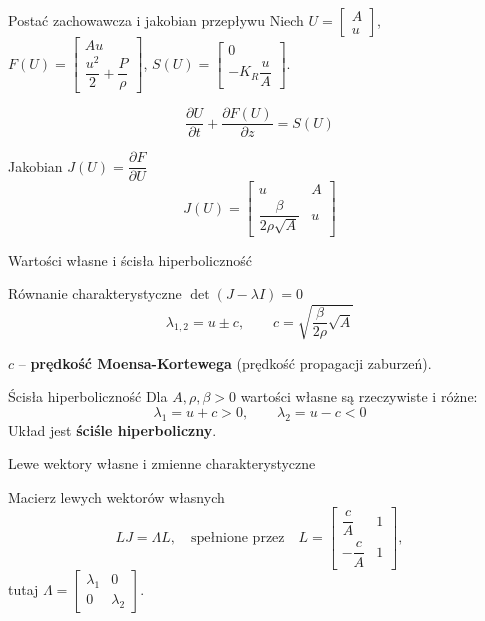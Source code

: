 \documentclass[aspectratio=169]{beamer}
\begin{document}
\begin{frame}{Postać zachowawcza i jakobian przepływu}
  Niech $U = \begin{bmatrix}A\\u\end{bmatrix}$, $F(U) = \begin{bmatrix}Au\\ \dfrac{u^2}{2} + \dfrac{P}{\rho}\end{bmatrix}$, $S(U) = \begin{bmatrix}0\\ -K_R\dfrac{u}{A}\end{bmatrix}$.

  \vspace{0.4em}
  \[
    \boxed{\frac{\partial U}{\partial t} + \frac{\partial F(U)}{\partial z} = S(U)}
  \]

  \vspace{0.4em}
  \begin{block}{Jakobian $J(U) = \dfrac{\partial F}{\partial U}$}
    \[
      J(U) = \begin{bmatrix} u & A \\[6pt] \dfrac{\beta}{2\rho\sqrt{A}} & u \end{bmatrix}
    \]
  \end{block}
\end{frame}

\begin{frame}{Wartości własne i ścisła hiperboliczność}
  \begin{block}{Równanie charakterystyczne $\det(J-\lambda I)=0$}
    \[
      \lambda_{1,2} = u \pm c,\qquad 
      c = \sqrt{\frac{\beta}{2\rho}\sqrt{A}}
    \]
  \end{block}

  \vspace{0.3em}
  $c$ -- \textbf{prędkość Moensa-Kortewega} (prędkość propagacji zaburzeń).

  \vspace{0.5em}
  \begin{block}{Ścisła hiperboliczność}
    Dla $A,\rho,\beta > 0$ wartości własne są rzeczywiste i różne:
    \[
      \lambda_1 = u+c > 0,\qquad \lambda_2 = u-c < 0
    \]
    Układ jest \textbf{ściśle hiperboliczny}.
  \end{block}
\end{frame}

\begin{frame}{Lewe wektory własne i zmienne charakterystyczne}
      \begin{block}{Macierz lewych wektorów własnych}
        \[ LJ = \Lambda L, \quad \text{spełnione przez} \quad
          L = \begin{bmatrix} \dfrac{c}{A} & 1 \\[8pt] -\dfrac{c}{A} & 1 \end{bmatrix},
        \]
        tutaj $\Lambda = \begin{bmatrix} \lambda_1 & 0 \\[8pt] 0& \lambda_2 \end{bmatrix}$.
      \end{block}
\end{frame}
\end{document}
